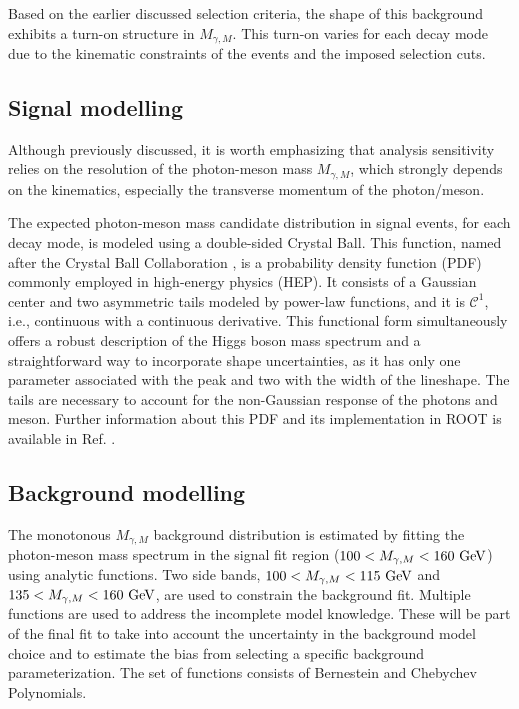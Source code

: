 Based on the earlier discussed selection criteria, the shape of this background exhibits a turn-on structure in $M_{\gamma, M}$. This turn-on varies for each decay mode due to the kinematic constraints of the events and the imposed selection cuts.

\subsection*{Signal modelling}

Although previously discussed, it is worth emphasizing that analysis sensitivity relies on the resolution of the photon-meson mass $M_{\gamma, M}$, which strongly depends on the kinematics, especially the transverse momentum of the photon/meson.

The expected photon-meson mass candidate distribution in signal events, for each decay mode, is modeled using a double-sided Crystal Ball. This function, named after the Crystal Ball Collaboration \cite{A2:CB}, is a probability density function (PDF) commonly employed in high-energy physics (HEP). It consists of a Gaussian center and two asymmetric tails modeled by power-law functions, and it is $\mathcal{C}^{1}$, i.e., continuous with a continuous derivative. This functional form simultaneously offers a robust description of the Higgs boson mass spectrum and a straightforward way to incorporate shape uncertainties, as it has only one parameter associated with the peak and two with the width of the lineshape. The tails are necessary to account for the non-Gaussian response of the photons and meson. Further information about this PDF and its implementation in ROOT is available in Ref. \cite{CERN:root_CB}.

\subsection*{Background modelling}

The monotonous $M_{\gamma, M}$ background distribution is estimated by fitting the photon-meson mass spectrum in the signal fit region ($100 < M_{\gamma, M} < 160\ \text{GeV}$) using analytic functions. Two side bands, $100 < M_{\gamma, M} < 115\ \GeV$ and $135 < M_{\gamma, M} < 160\ \text{GeV}$, are used to constrain the background fit. Multiple functions are used to address the incomplete model knowledge. These will be part of the final fit to take into account the uncertainty in the background model choice and to estimate the bias from selecting a specific background parameterization. The set of functions consists of Bernestein and Chebychev Polynomials.

